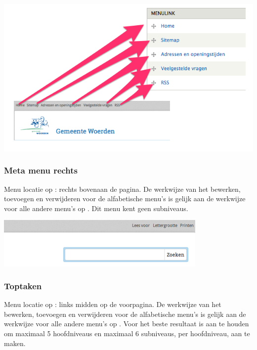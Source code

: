 \begin{center}
	\includegraphics[width=\textwidth]{img/meta-menu.png}
\end{center}

\bigskip

\subsubsection{Meta menu rechts}\label{metamenurechts}
Menu locatie op \drupalpath{}: rechts bovenaan de pagina. De werkwijze van het bewerken, toevoegen en verwijderen voor de alfabetische menu's is gelijk aan de werkwijze voor alle andere menu's op \drupalpath{}. Dit menu kent geen subniveaus.
\bigskip

\begin{center}
	\includegraphics[width=\textwidth]{img/menu_metarechts.png}
\end{center}

\bigskip

\subsubsection{Toptaken}\label{toptaken}
Menu locatie op \drupalpath{}: links midden op de voorpagina. De werkwijze van het bewerken, toevoegen en verwijderen voor de alfabetische menu's is gelijk aan de werkwijze voor alle andere menu's op \drupalpath{}. Voor het beste resultaat is aan te houden om maximaal 5 hoofdniveaus en maximaal 6 subniveaus, per hoofdniveau, aan te maken.

